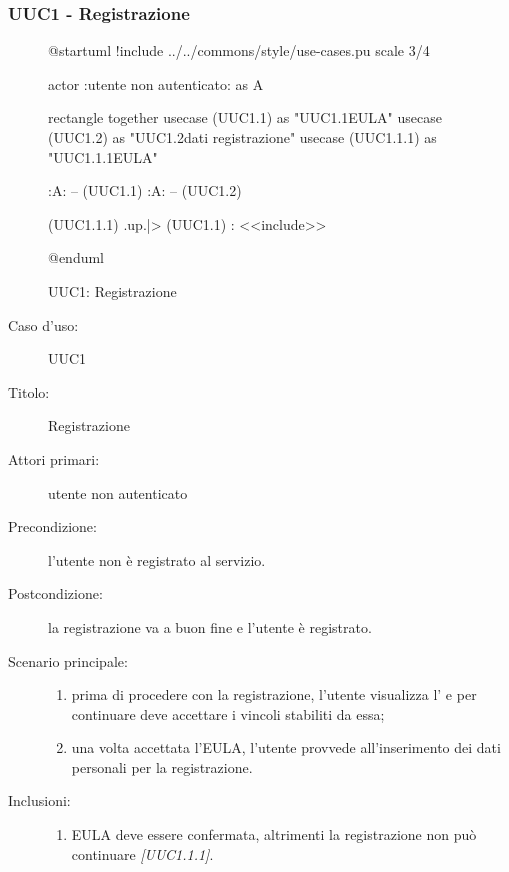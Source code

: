 \documentclass[casi-duso]{subfiles}
\begin{document}
\subsubsection{UUC1 - Registrazione}%
\label{subsub:UUC1utente}

\begin{figure}[h!]
  \centering
  \begin{plantuml}
  @startuml
  !include ../../commons/style/use-cases.pu
  scale 3/4

  actor :utente non autenticato: as A

  rectangle {
    together {
      usecase (UUC1.1) as "UUC1.1\nVisualizzazione EULA"
      usecase (UUC1.2) as "UUC1.2\nInserimento dati registrazione"
      usecase (UUC1.1.1) as "UUC1.1.1\nConferma EULA"
    }
  }

  :A: -- (UUC1.1)
  :A: -- (UUC1.2)

  (UUC1.1.1) .up.|> (UUC1.1) : <<include>>

  @enduml
  \end{plantuml}
  \caption{UUC1: Registrazione}
  \label{fig:uuc1}
\end{figure}

\begin{description}
  \item[Caso d’uso:] UUC1
  \item[Titolo:] Registrazione
  \item[Attori primari:] utente non autenticato
  \item[Precondizione:] l'utente non è registrato al servizio.
  \item[Postcondizione:] la registrazione va a buon fine e l'utente è registrato.
  \item[Scenario principale:]
        \begin{enumerate}
          \item prima di procedere con la registrazione, l'utente visualizza l' e per continuare deve accettare i vincoli stabiliti da essa;
          \item una volta accettata l'EULA, l'utente provvede all'inserimento dei dati personali per la registrazione.
        \end{enumerate}
  \item[Inclusioni:]
        \begin{enumerate}
          \item EULA deve essere confermata, altrimenti la registrazione non può continuare \emph{[UUC1.1.1]}.
        \end{enumerate}
\end{description}
\end{document}
